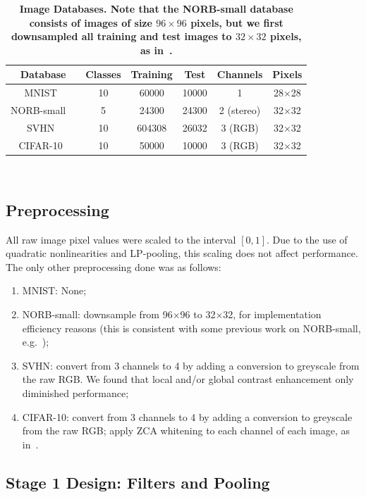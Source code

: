 \documentclass[conference]{IEEEtran}
\begin{document}
\begin{table}[!ht]
{\footnotesize
\begin{tabular}{|c|c|c|c|c|c|}
\hline
Database & Classes & Training & Test  & Channels & Pixels\\
\hline
MNIST~\cite{MNIST} & 10 & 60000 & 10000 & 1 & 28$\times$28\\
NORB-small~\cite{LeCun.04}\ & 5 & 24300 & 24300 & 2 (stereo) & 32$\times$32\\
SVHN~\cite{SVHN}  & 10 & 604308 & 26032 &  3 (RGB) & 32$\times$32\\
CIFAR-10~\cite{Krizhevsky} & 10 & 50000 & 10000 & 3 (RGB) & 32$\times$32\\
\hline
\end{tabular}
~\\
\caption{\bf{Image Databases. Note that the NORB-small database consists of images of size $96 \times 96$ pixels, but we first downsampled all training and test images to $32 \times 32$ pixels, as in~\cite{Le.10}.}}\label{Table1}
}
\end{table}%

\subsection{Preprocessing}

All raw image pixel values were scaled to the interval $[0,1]$. Due to the use of quadratic nonlinearities and LP-pooling, this scaling does not affect performance. The only other preprocessing done was as follows:
\begin{enumerate}
\item MNIST: None;
\item NORB-small: downsample from 96$\times$96 to 32$\times$32, for implementation efficiency reasons (this is consistent with some previous work on NORB-small, e.g.~\cite{Le.10});
\item SVHN: convert from 3 channels to 4 by adding a conversion to greyscale from the raw RGB. We found that local and/or global contrast enhancement only diminished performance;
\item CIFAR-10: convert from 3 channels to 4 by adding a conversion to greyscale from the raw RGB; apply ZCA whitening to each channel of each image, as in~\cite{Coates.11}.
\end{enumerate}


\subsection{Stage 1 Design: Filters and Pooling}\label{S:s1design}\label{S:filters}
\end{document}
